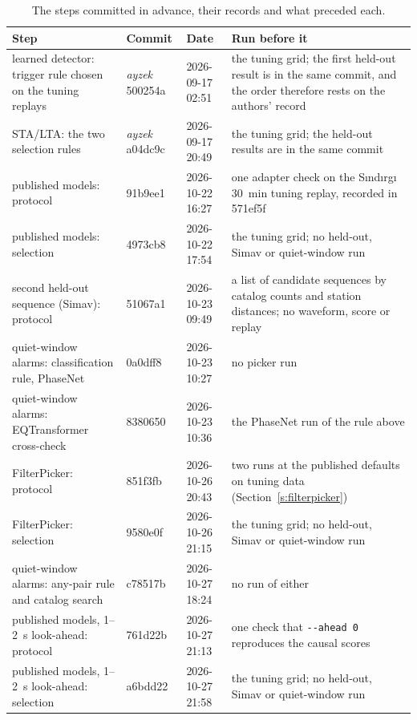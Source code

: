 \documentclass[11pt,a4paper]{article}
\newcommand{\stalta}{STA/LTA}
\newcommand{\tool}[1]{\nolinkurl{#1}}
\begin{document}
\begin{table}[htbp]
  \centering\footnotesize\setlength{\tabcolsep}{4pt}
  \caption{The steps committed in advance, their records and what preceded each.}\label{t:prereg}
  \begin{tabular}{@{}L{3.6cm}L{2.9cm}L{2.3cm}L{5.6cm}@{}}
    \toprule
    Step & Commit & Date & Run before it \\
    \midrule
    learned detector: trigger rule chosen on the tuning replays &
    \emph{ayzek} 500254a & 2026-09-17 02:51 &
    the tuning grid; the first held-out result is in the same commit, and the order therefore rests on the authors' record \\
    \stalta{}: the two selection rules &
    \emph{ayzek} a04dc9c & 2026-09-17 20:49 &
    the tuning grid; the held-out results are in the same commit \\
    published models: protocol & 91b9ee1 & 2026-10-22 16:27 &
    one adapter check on the S\i{}nd\i{}rg\i{} 30~min tuning replay, recorded in
    571ef5f \\
    published models: selection & 4973cb8 & 2026-10-22 17:54 &
    the tuning grid; no held-out, Simav or quiet-window run \\
    second held-out sequence (Simav): protocol & 51067a1 & 2026-10-23 09:49 &
    a list of candidate sequences by catalog counts and station distances;
    no waveform, score or replay \\
    quiet-window alarms: classification rule, PhaseNet & 0a0dff8 & 2026-10-23 10:27 &
    no picker run \\
    quiet-window alarms: EQTransformer cross-check & 8380650 & 2026-10-23 10:36 &
    the PhaseNet run of the rule above \\
    FilterPicker: protocol & 851f3fb & 2026-10-26 20:43 &
    two runs at the published defaults on tuning data (Section~\ref{s:filterpicker}) \\
    FilterPicker: selection & 9580e0f & 2026-10-26 21:15 &
    the tuning grid; no held-out, Simav or quiet-window run \\
    quiet-window alarms: any-pair rule and catalog search & c78517b & 2026-10-27 18:24 &
    no run of either \\
    published models, 1--2~s look-ahead: protocol & 761d22b & 2026-10-27 21:13 &
    one check that \tool{--ahead 0} reproduces the causal scores \\
    published models, 1--2~s look-ahead: selection & a6bdd22 & 2026-10-27 21:58 &
    the tuning grid; no held-out, Simav or quiet-window run \\

\end{tabular}
\end{table}
\end{document}
